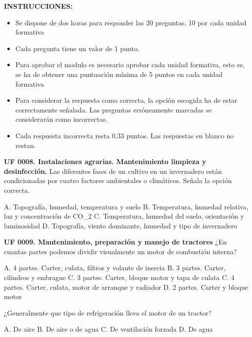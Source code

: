 \documentclass[11pt]{exam}
\begin{document}
{\selectfont
\textbf{INSTRUCCIONES:}
\begin{itemize}
    \item Se dispone de dos horas para responder las 20 preguntas. 10 por cada unidad formativa
    \item Cada pregunta tiene un valor de 1 punto.
    \item Para aprobar el modulo es necesario aprobar cada unidad formativa,
      esto es, se ha de obtener una puntuación mínima de 5 puntos en cada unidad
      formativa 
    \item Para considerar la respuesta como correcta, la opción escogida ha de
      estar correctamente señalada. Las preguntas erróneamente marcadas se
      considerarán como incorrectas. 
    \item Cada respuesta incorrecta resta 0.33 puntos. Las respuestas en blanco no restan. 
\end{itemize}
\vspace{1cm}

\begin{questions}
  \textbf{UF 0008. Instalaciones agrarias. Mantenimiento limpieza y
    desinfección.}
  \question Las diferentes fases de un cultivo en un invernadero están
    condicionadas por cuatro factores ambientales o climáticos. Señala la opción
    correcta.
    \begin{checkboxes}
      \choice A. Topografía, humedad, temperatura y suelo
      \CorrectChoice B. Temperatura, humedad relativa, luz y concentración de
      CO_2
      \choice C. Temperatura, humedad del suelo, orientación y luminosidad
      \choice D. Topografía, viento dominante, humedad y tipo de invernadero
    \end{checkboxes}
\newpage  
\textbf{UF 0009. Mantenimiento, preparación y manejo de tractores}  
\question ¿En cuantas partes podemos dividir visualmente un motor de combustión interna? 
\begin{checkboxes}
\choice A. 4 partes. Carter, culata, filtros y volante de inercia
\choice B. 3 partes. Carter, cilindros y embrague 
\CorrectChoice C. 3 partes. Carter, bloque motor y tapa de culata
\choice C. 4 partes. Carter, culata, motor de arranque y radiador    
\choice D. 2 partes. Carter y bloque motor
\end{checkboxes}

\question ¿Generalmente que tipo de refrigeración lleva el motor de un tractor?
\begin{checkboxes}
\choice A. De aire
\choice B. De aire o de agua
\choice C. De ventilación forzada
\CorrectChoice D. De agua
\end{checkboxes}


\end{questions}}
\end{document}
